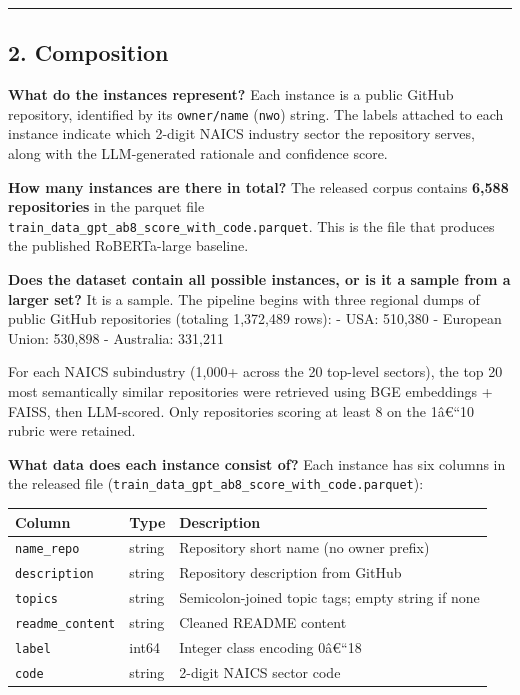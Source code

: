 \begin{center}\rule{0.5\linewidth}{0.5pt}\end{center}

\hypertarget{composition}{%
\subsection{2. Composition}\label{composition}}

\textbf{What do the instances represent?}
Each instance is a public GitHub repository, identified by its
\texttt{owner/name} (\texttt{nwo}) string. The labels attached to each instance
indicate which 2-digit NAICS industry sector the repository serves,
along with the LLM-generated rationale and confidence score.

\textbf{How many instances are there in total?}
The released corpus contains \textbf{6,588 repositories} in the parquet
file \texttt{train\_data\_gpt\_ab8\_score\_with\_code.parquet}. This is the file
that produces the published RoBERTa-large baseline.

\textbf{Does the dataset contain all possible instances, or is it a sample
from a larger set?}
It is a sample. The pipeline begins with three regional dumps of
public GitHub repositories (totaling 1,372,489 rows):
- USA: 510,380
- European Union: 530,898
- Australia: 331,211

For each NAICS subindustry (1,000+ across the 20 top-level sectors),
the top 20 most semantically similar repositories were retrieved using
BGE embeddings + FAISS, then LLM-scored. Only repositories scoring at
least 8 on the 1â€``10 rubric were retained.

\textbf{What data does each instance consist of?}
Each instance has six columns in the released file
(\texttt{train\_data\_gpt\_ab8\_score\_with\_code.parquet}):

\begin{longtable}[]{@{}lll@{}}
\toprule
Column & Type & Description \\
\midrule
\endhead
\texttt{name\_repo} & string & Repository short name (no owner prefix) \\
\texttt{description} & string & Repository description from GitHub \\
\texttt{topics} & string & Semicolon-joined topic tags; empty string if none \\
\texttt{readme\_content} & string & Cleaned README content \\
\texttt{label} & int64 & Integer class encoding 0â€``18 \\
\texttt{code} & string & 2-digit NAICS sector code \\
\bottomrule
\end{longtable}

